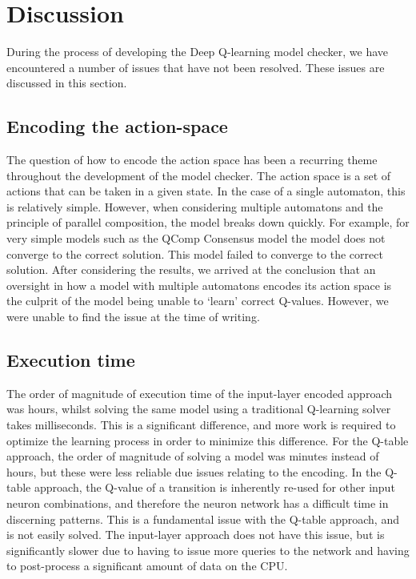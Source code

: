 \section{Discussion}

During the process of developing the Deep Q-learning model checker, we have encountered a number of issues that have not been resolved. These issues are discussed in this section.

\subsection{Encoding the action-space}

The question of how to encode the action space has been a recurring theme throughout the development of the model checker. The action space is a set of actions that can be taken in a given state. In the case of a single automaton, this is relatively simple. However, when considering multiple automatons and the principle of parallel composition, the model breaks down quickly. For example, for very simple models such as the QComp Consensus model \cite{consensus} the model does not converge to the correct solution. This model failed to converge to the correct solution. After considering the results, we arrived at the conclusion that an oversight in how a model with multiple automatons encodes its action space is the culprit of the model being unable to `learn' correct Q-values. However, we were unable to find the issue at the time of writing.

\subsection{Execution time}

The order of magnitude of execution time of the input-layer encoded approach was hours, whilst solving the same model using a traditional Q-learning solver takes milliseconds. This is a significant difference, and more work is required to optimize the learning process in order to minimize this difference. For the Q-table approach, the order of magnitude of solving a model was minutes instead of hours, but these were less reliable due issues relating to the encoding. In the Q-table approach, the Q-value of a transition is inherently re-used for other input neuron combinations, and therefore the neuron network has a difficult time in discerning patterns. This is a fundamental issue with the Q-table approach, and is not easily solved. The input-layer approach does not have this issue, but is significantly slower due to having to issue more queries to the network and having to post-process a significant amount of data on the CPU.

